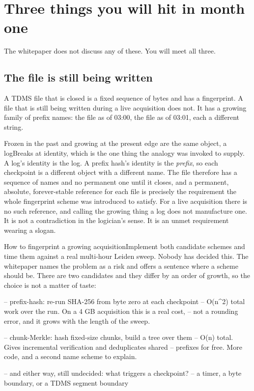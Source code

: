 \section{Three things you will hit in month one}

The whitepaper does not discuss any of these. You will meet all three.

\subsection{The file is still being written}

A TDMS file that is closed is a fixed sequence of bytes and has a fingerprint. A file that is still being written during a live acquisition does not. It has a growing family of prefix names: the file as of 03:00, the file as of 03:01, each a different string.

\begin{Analogy}{Frozen in the past and growing at the present edge are the same object, a log}{Breaks at identity, which is the one thing the analogy was invoked to supply.}
A log's identity is the log. A prefix hash's identity is the \emph{prefix}, so each checkpoint is a different object with a different name. The file therefore has a sequence of names and no permanent one until it closes, and a permanent, absolute, forever-stable reference for each file is precisely the requirement the whole fingerprint scheme was introduced to satisfy. For a live acquisition there is no such reference, and calling the growing thing a log does not manufacture one. It is not a contradiction in the logician's sense. It is an unmet requirement wearing a slogan.
\end{Analogy}

\begin{Open}{How to fingerprint a growing acquisition}{Implement both candidate schemes and time them against a real multi-hour Leiden sweep.}
Nobody has decided this. The whitepaper names the problem as a risk and offers a sentence where a scheme should be. There are two candidates and they differ by an order of growth, so the choice is not a matter of taste:

\begin{Check}
-- prefix-hash: re-run SHA-256 from byte zero at each checkpoint
--   O(n^2) total work over the run. On a 4 GB acquisition this is a real cost,
--   not a rounding error, and it grows with the length of the sweep.

-- chunk-Merkle: hash fixed-size chunks, build a tree over them
--   O(n) total. Gives incremental verification and deduplicates shared
--   prefixes for free. More code, and a second name scheme to explain.

-- and either way, still undecided: what triggers a checkpoint?
--   a timer, a byte boundary, or a TDMS segment boundary
\end{Check}
\end{Open}

